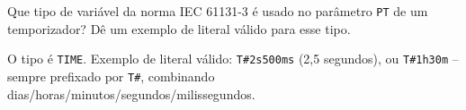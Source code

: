 \question[2] Que tipo de variável da norma IEC 61131-3 é usado no parâmetro \texttt{PT} de um temporizador? Dê um exemplo de literal válido para esse tipo.

\begin{solution}
O tipo é \texttt{TIME}. Exemplo de literal válido: \texttt{T\#2s500ms} (2,5 segundos), ou \texttt{T\#1h30m} -- sempre prefixado por \texttt{T\#}, combinando dias/horas/minutos/segundos/milissegundos.
\end{solution}
